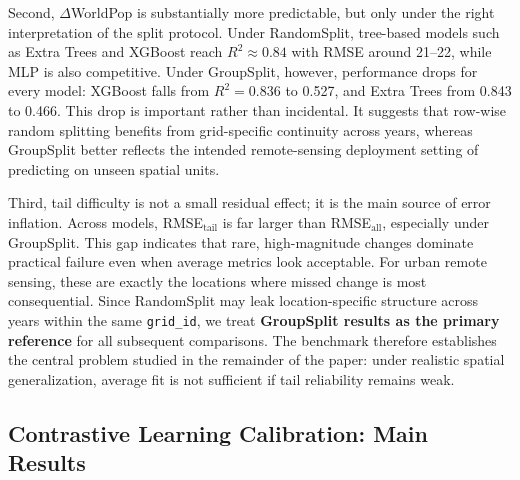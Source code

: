 \documentclass[preprint,12pt]{elsarticle}
\begin{document}
Second, $\Delta$WorldPop is substantially more predictable, but only under the right interpretation of the split protocol. Under RandomSplit, tree-based models such as Extra Trees and XGBoost reach $R^2 \approx 0.84$ with RMSE around 21--22, while MLP is also competitive. Under GroupSplit, however, performance drops for every model: XGBoost falls from $R^2=0.836$ to 0.527, and Extra Trees from 0.843 to 0.466. This drop is important rather than incidental. It suggests that row-wise random splitting benefits from grid-specific continuity across years, whereas GroupSplit better reflects the intended remote-sensing deployment setting of predicting on unseen spatial units.

Third, tail difficulty is not a small residual effect; it is the main source of error inflation. Across models, RMSE$_{\text{tail}}$ is far larger than RMSE$_{\text{all}}$, especially under GroupSplit. This gap indicates that rare, high-magnitude changes dominate practical failure even when average metrics look acceptable. For urban remote sensing, these are exactly the locations where missed change is most consequential. Since RandomSplit may leak location-specific structure across years within the same \texttt{grid\_id}, we treat \textbf{GroupSplit results as the primary reference} for all subsequent comparisons. The benchmark therefore establishes the central problem studied in the remainder of the paper: under realistic spatial generalization, average fit is not sufficient if tail reliability remains weak.


\subsection{Contrastive Learning Calibration: Main Results}
\end{document}
